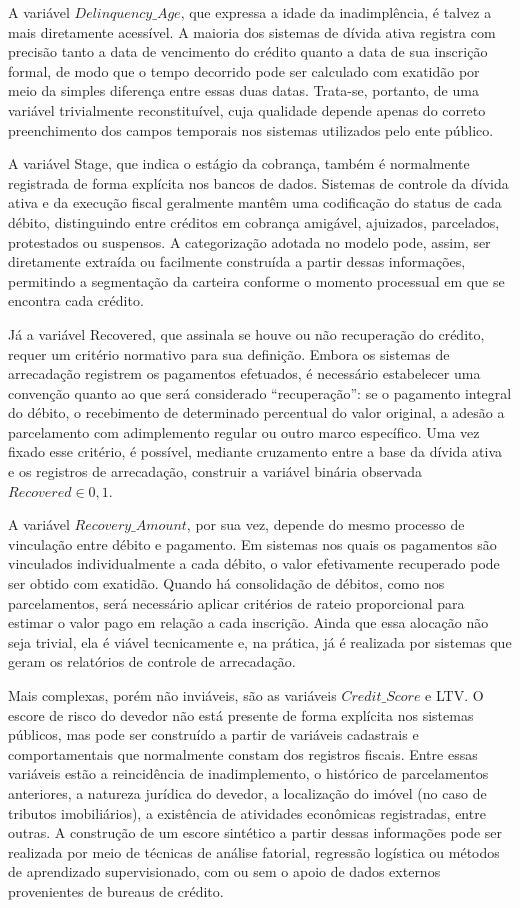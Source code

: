 \documentclass[a4paper,12pt]{article}
\begin{document}
A variável $Delinquency\_Age$, que expressa a idade da inadimplência, é talvez a mais diretamente acessível. A maioria dos sistemas de dívida ativa registra com precisão tanto a data de vencimento do crédito quanto a data de sua inscrição formal, de modo que o tempo decorrido pode ser calculado com exatidão por meio da simples diferença entre essas duas datas. Trata-se, portanto, de uma variável trivialmente reconstituível, cuja qualidade depende apenas do correto preenchimento dos campos temporais nos sistemas utilizados pelo ente público.

A variável Stage, que indica o estágio da cobrança, também é normalmente registrada de forma explícita nos bancos de dados. Sistemas de controle da dívida ativa e da execução fiscal geralmente mantêm uma codificação do status de cada débito, distinguindo entre créditos em cobrança amigável, ajuizados, parcelados, protestados ou suspensos. A categorização adotada no modelo pode, assim, ser diretamente extraída ou facilmente construída a partir dessas informações, permitindo a segmentação da carteira conforme o momento processual em que se encontra cada crédito.

Já a variável Recovered, que assinala se houve ou não recuperação do crédito, requer um critério normativo para sua definição. Embora os sistemas de arrecadação registrem os pagamentos efetuados, é necessário estabelecer uma convenção quanto ao que será considerado “recuperação”: se o pagamento integral do débito, o recebimento de determinado percentual do valor original, a adesão a parcelamento com adimplemento regular ou outro marco específico. Uma vez fixado esse critério, é possível, mediante cruzamento entre a base da dívida ativa e os registros de arrecadação, construir a variável binária observada 
$Recovered \in {0,1}$.

A variável $Recovery\_Amount$, por sua vez, depende do mesmo processo de vinculação entre débito e pagamento. Em sistemas nos quais os pagamentos são vinculados individualmente a cada débito, o valor efetivamente recuperado pode ser obtido com exatidão. Quando há consolidação de débitos, como nos parcelamentos, será necessário aplicar critérios de rateio proporcional para estimar o valor pago em relação a cada inscrição. Ainda que essa alocação não seja trivial, ela é viável tecnicamente e, na prática, já é realizada por sistemas que geram os relatórios de controle de arrecadação.

Mais complexas, porém não inviáveis, são as variáveis $Credit\_Score$ e LTV. O escore de risco do devedor não está presente de forma explícita nos sistemas públicos, mas pode ser construído a partir de variáveis cadastrais e comportamentais que normalmente constam dos registros fiscais. Entre essas variáveis estão a reincidência de inadimplemento, o histórico de parcelamentos anteriores, a natureza jurídica do devedor, a localização do imóvel (no caso de tributos imobiliários), a existência de atividades econômicas registradas, entre outras. A construção de um escore sintético a partir dessas informações pode ser realizada por meio de técnicas de análise fatorial, regressão logística ou métodos de aprendizado supervisionado, com ou sem o apoio de dados externos provenientes de bureaus de crédito.
\end{document}
